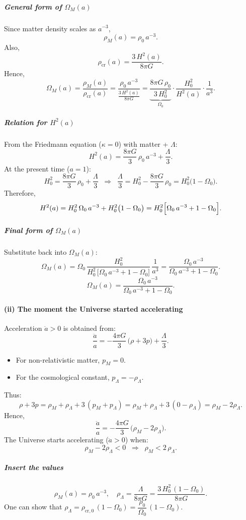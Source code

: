 \documentclass{article}
\begin{document}
\subparagraph{General form of \(\Omega_M(a)\)}
Since matter density scales as \(a^{-3}\),
\[
\rho_M(a) = \rho_0\,a^{-3}.
\]
Also,
\[
\rho_{\text{cr}}(a) = \frac{3\,H^2(a)}{8\pi G}.
\]
Hence,
\[
\Omega_M(a)
= \frac{\rho_M(a)}{\rho_{\text{cr}}(a)}
= \frac{\rho_0\,a^{-3}}{\frac{3\,H^2(a)}{8\pi G}}
= \underbrace{\frac{8\pi G\,\rho_0}{3\,H_0^2}}_{\displaystyle \Omega_0}
\cdot \frac{H_0^2}{H^2(a)} \cdot \frac{1}{a^3}.
\]

\subparagraph{Relation for \(H^2(a)\)}
From the Friedmann equation (\(\kappa = 0\)) with matter + \(\Lambda\):
\[
H^2(a)
= \frac{8\pi G}{3}\,\rho_0\,a^{-3} + \frac{\Lambda}{3}.
\]
At the present time (\(a = 1\)):
\[
H_0^2
= \frac{8\pi G}{3}\,\rho_0 + \frac{\Lambda}{3}
\;\;\Longrightarrow\;\;
\frac{\Lambda}{3}
= H_0^2 - \frac{8\pi G}{3}\,\rho_0
= H_0^2\bigl(1 - \Omega_0\bigr).
\]
Therefore,
\[
H^2(a)
= H_0^2\,\Omega_0\,a^{-3} + H_0^2\bigl(1-\Omega_0\bigr)
= H_0^2\Bigl[\Omega_0\,a^{-3} + 1 - \Omega_0\Bigr].
\]

\subparagraph{Final form of \(\Omega_M(a)\)}
Substitute back into \(\Omega_M(a)\):
\[
\Omega_M(a)
= \Omega_0 \,\frac{H_0^2}{H_0^2\,\bigl[\Omega_0\,a^{-3} + 1 - \Omega_0\bigr]}\,\frac{1}{a^3}
= \frac{\Omega_0\,a^{-3}}{\Omega_0\,a^{-3} + 1 - \Omega_0}.
\]
\[
\boxed{
\Omega_M(a)
= \frac{\Omega_0\,a^{-3}}{\Omega_0\,a^{-3} + 1 - \Omega_0}.
}
\]

\paragraph{(ii) The moment the Universe started accelerating}

Acceleration \(\ddot{a} > 0\) is obtained from:
\[
\frac{\ddot{a}}{a}
= -\frac{4\pi G}{3}\,\bigl(\rho + 3p\bigr) + \frac{\Lambda}{3}.
\]
\begin{itemize}
  \item For non-relativistic matter, \(p_M = 0\).
  \item For the cosmological constant, \(p_\Lambda = -\rho_\Lambda\).
\end{itemize}

Thus:
\[
\rho + 3p
= \rho_M + \rho_\Lambda + 3\,(p_M + p_\Lambda)
= \rho_M + \rho_\Lambda + 3\,(0 - \rho_\Lambda)
= \rho_M - 2\rho_\Lambda.
\]
Hence,
\[
\frac{\ddot{a}}{a}
= -\frac{4\pi G}{3}\,\bigl(\rho_M - 2\rho_\Lambda\bigr).
\]
The Universe starts accelerating (\(\ddot{a} > 0\)) when:
\[
\rho_M - 2\rho_\Lambda < 0
\;\;\Longrightarrow\;\;
\rho_M < 2\,\rho_\Lambda.
\]

\subparagraph{Insert the values}
\[
\rho_M(a) = \rho_0\,a^{-3},
\quad
\rho_\Lambda = \frac{\Lambda}{8\pi G}
= \frac{3\,H_0^2\,(1-\Omega_0)}{8\pi G}.
\]
One can show that
\(\rho_\Lambda = \rho_{\text{cr},0}\,(1-\Omega_0) = \dfrac{\rho_0}{\Omega_0}\,(1-\Omega_0).\)
\end{document}
